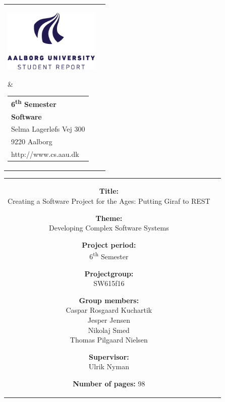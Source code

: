 \begin{titlepage}
	\setlength{\textwidth}{15cm}
	\noindent
	\begin{nopagebreak}
		{\samepage 
			\begin{tabular}{lr}
				\parbox{0.5\textwidth}{\raisebox{11mm}
					{\includegraphics[height=3cm]{img/aau-logo-english.png}}
				} &
				\parbox{0.4\textwidth}{
					\small
					\begin{tabular}{l}
						{\sf\small \textbf{6\textsuperscript{th} Semester}}\\
 						{\sf\small \textbf{Software}}\\
						{\sf\small Selma Lagerløfs Vej 300 } \\
						{\sf\small 9220 Aalborg} \\
						{\sf\small http://www.cs.aau.dk}
					\end{tabular}
				}
			\end{tabular}
			
			\noindent
			\begin{tabular}{cc}
				\parbox[t]{.45\textwidth}{
					\vspace{.15cm}
					\begin{description}
						\item {\bf Title:}\\
						Creating a Software Project for the Ages: Putting Giraf to REST	
						\item {\bf Theme:}\\
						Developing Complex Software Systems	
						\item {\bf Project period:}\\
							6\textsuperscript{th} Semester
			 				\hspace{4cm}
						\item {\bf Projectgroup:}\\
							SW615f16
			  				\hspace{4cm}
						\item {\bf Group members:}\\
							Caspar Rosgaard Kuchartik\\
							Jesper Jensen\\
							Nikolaj Smed\\
							Thomas Pilgaard Nielsen
						\item {\bf Supervisor:}\\
							Ulrik Nyman
						\item {\bf Number of pages:} 98  
							

\end{description}}
\end{tabular}}
\end{nopagebreak}
\end{titlepage}
